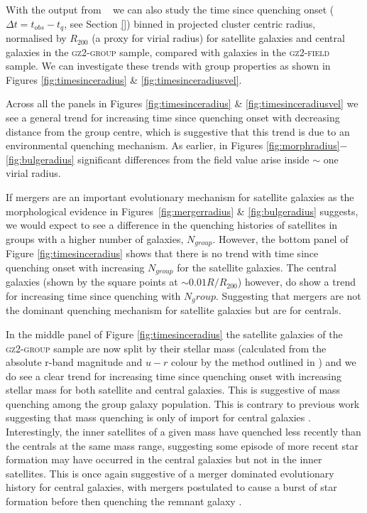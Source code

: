 With the output from \starpy~ we can also study the time since quenching onset ($\Delta t = t_{obs} - t_{q}$, see Section \ref{}) binned in projected cluster centric radius, normalised by $R_{200}$ (a proxy for virial radius) for satellite galaxies and central galaxies in the \textsc{gz2-group} sample, compared with galaxies in the \textsc{gz2-field} sample. We can investigate these trends with group properties as shown in Figures \ref{fig:timesinceradius} \& \ref{fig:timesinceradiusvel}. 

Across all the panels in Figures \ref{fig:timesinceradius} \& \ref{fig:timesinceradiusvel} we see a general trend for increasing time since quenching onset with decreasing distance from the group centre, which is suggestive that this trend is due to an environmental quenching mechanism. As earlier, in Figures \ref{fig:morphradius}$-$\ref{fig:bulgeradius} significant differences from the field value arise inside $\sim$ one virial radius. 

If mergers are an important evolutionary mechanism for satellite galaxies as the morphological evidence in Figures~\ref{fig:mergerradius} \& \ref{fig:bulgeradius} suggests, we would expect to see a difference in the quenching histories of satellites in groups with a higher number of galaxies, $N_{group}$. However, the bottom panel of Figure \ref{fig:timesinceradius} shows that there is no trend with time since quenching onset with increasing $N_{group}$ for the satellite galaxies. The central galaxies (shown by the square points at $\sim 0.01 R/R_{200}$) however, do show a trend for increasing time since quenching with $N_group$. Suggesting that mergers are not the dominant quenching mechanism for satellite galaxies but are for centrals.  

In the middle panel of Figure \ref{fig:timesinceradius} the satellite galaxies of the \textsc{gz2-group} sample are now split by their stellar mass (calculated from the absolute r-band magnitude and $u-r$ colour by the method outlined in \citealt{baldry06}) and we do see a clear trend for increasing time since quenching onset with increasing stellar mass for both satellite and central galaxies. This is suggestive of mass quenching among the group galaxy population. This is contrary to previous work suggesting that mass quenching is only of import for central galaxies \citep{ref, ref, ref}. Interestingly, the inner satellites of a given mass have quenched less recently than the centrals at the same mass range, suggesting some episode of more recent star formation may have occurred in the central galaxies but not in the inner satellites. This is once again suggestive of a merger dominated evolutionary history for central galaxies, with mergers postulated to cause a burst of star formation before then quenching the remnant galaxy \citep{?,?, pontzen16}. 

